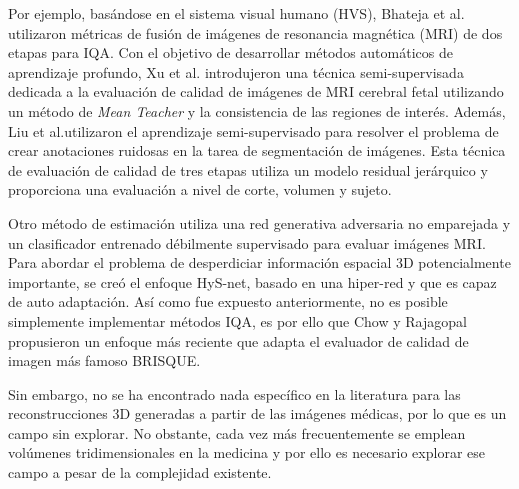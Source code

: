 Por ejemplo, basándose en el sistema visual humano (HVS), 
Bhateja et al.\cite{MultiModalMRIFusionMethod} utilizaron métricas de fusión
de imágenes de resonancia magnética (MRI) de dos etapas para IQA.
Con el objetivo de desarrollar métodos automáticos de aprendizaje profundo,
Xu et al.\cite{SemiSupervisedMRIFetalBrain} introdujeron una técnica semi-supervisada dedicada a la evaluación de 
calidad de imágenes de MRI cerebral fetal utilizando un método de 
\emph{Mean Teacher}\cite{MeanTeacher} y la consistencia de las regiones de interés. 
Además, Liu et al.\cite{IQAForPediatricMRIWithNoisySegmentation}utilizaron el aprendizaje semi-supervisado para resolver 
el problema de crear anotaciones ruidosas en la tarea de segmentación de imágenes. 
Esta técnica de evaluación de calidad de tres etapas utiliza un modelo residual 
jerárquico y proporciona una evaluación a nivel de corte, volumen y sujeto. 

Otro método de estimación utiliza una red generativa adversaria no emparejada 
y un clasificador entrenado débilmente supervisado para evaluar imágenes MRI\cite{MIGAN}.
Para abordar el problema de desperdiciar información espacial 3D potencialmente importante, 
se creó el enfoque HyS-net\cite{Hys-net}, basado en una hiper-red y que es capaz de 
auto adaptación. Así como fue expuesto anteriormente, no es posible 
simplemente implementar métodos IQA, es por ello que Chow y Rajagopal \cite{MedicalBRISQUE} 
propusieron un enfoque más reciente que adapta el evaluador de calidad de imagen más famoso BRISQUE\cite{BRISQUE}.

Sin embargo, no se ha encontrado nada específico en la literatura para las 
reconstrucciones 3D generadas a partir de las imágenes médicas, por lo que es 
un campo sin explorar. 
No obstante, cada vez más frecuentemente se emplean 
volúmenes tridimensionales en la medicina y por ello es necesario explorar ese 
campo a pesar de la complejidad existente.
